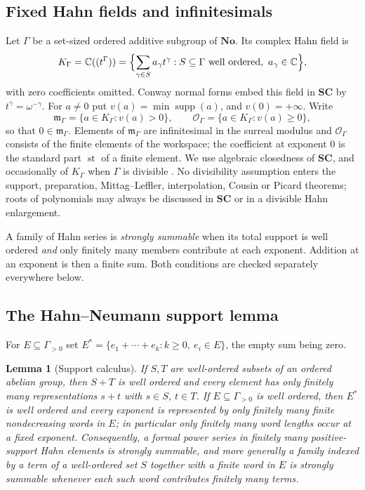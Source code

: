 \documentclass[11pt,letterpaper]{article}
\newtheorem{lemma}[lemma]{Lemma}
\theoremstyle{definition}
\theoremstyle{remark}
\newcommand{\No}{\mathbf{No}}
\newcommand{\SC}{\mathbf{SC}}
\newcommand{\C}{\mathbb C}
\newcommand{\OO}{\mathcal O}
\newcommand{\KK}{K_\Gamma}
\newcommand{\mK}{\mathfrak m_\Gamma}
\newcommand{\st}{\operatorname{st}}
\newcommand{\supp}{\operatorname{supp}}
\numberwithin{equation}{section}
\begin{document}
\subsection{Fixed Hahn fields and infinitesimals}

Let $\Gamma$ be a set-sized ordered additive subgroup of $\No$. Its complex Hahn field is
\begin{equation}\label{global:eq:Kdef}
  \KK=\C((t^\Gamma))
  =\Bigl\{\sum_{\gamma\in S}a_\gamma t^\gamma:
  S\subseteq\Gamma\text{ well ordered},\ a_\gamma\in\C\Bigr\},
\end{equation}
with zero coefficients omitted. Conway normal forms embed this field in $\SC$ by $t^\gamma=\omega^{-\gamma}$. For $a\ne0$ put $v(a)=\min\supp(a)$, and $v(0)=+\infty$. Write
\[
  \mK=\{a\in\KK:v(a)>0\},
  \qquad \OO_\Gamma=\{a\in\KK:v(a)\ge0\},
\]
so that $0\in\mK$. Elements of $\mK$ are infinitesimal in the surreal modulus and $\OO_\Gamma$ consists of the finite elements of the workspace; the coefficient at exponent $0$ is the standard part $\st$ of a finite element. We use algebraic closedness of $\SC$, and occasionally of $\KK$ when $\Gamma$ is divisible \cite[Corollary~4]{Poonen}. No divisibility assumption enters the support, preparation, Mittag--Leffler, interpolation, Cousin or Picard theorems; roots of polynomials may always be discussed in $\SC$ or in a divisible Hahn enlargement.

A family of Hahn series is \emph{strongly summable} when its total support is well ordered \emph{and} only finitely many members contribute at each exponent. Addition at an exponent is then a finite sum. Both conditions are checked separately everywhere below.

\subsection{The Hahn--Neumann support lemma}

For $E\subseteq\Gamma_{>0}$ set $E^*=\{e_1+\cdots+e_k:k\ge0,\ e_i\in E\}$, the empty sum being zero.

\begin{lemma}[Support calculus]\label{global:lem:support}
If $S,T$ are well-ordered subsets of an ordered abelian group, then $S+T$ is well ordered and every element has only finitely many representations $s+t$ with $s\in S$, $t\in T$. If $E\subseteq\Gamma_{>0}$ is well ordered, then $E^*$ is well ordered and every exponent is represented by only finitely many finite nondecreasing words in $E$; in particular only finitely many word lengths occur at a fixed exponent. Consequently, a formal power series in finitely many positive-support Hahn elements is strongly summable, and more generally a family indexed by a term of a well-ordered set $S$ together with a finite word in $E$ is strongly summable whenever each such word contributes finitely many terms.
\end{lemma}
\end{document}
